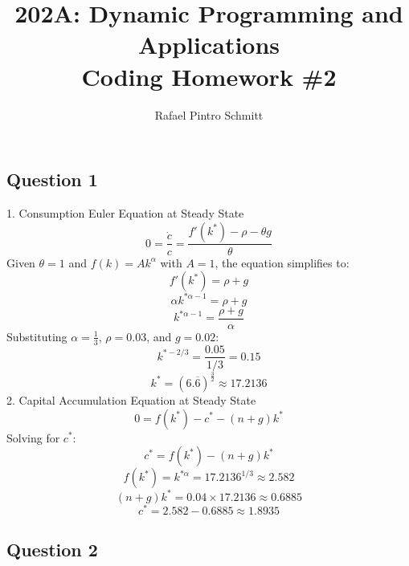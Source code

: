 \documentclass{article}
\title{202A: Dynamic Programming and Applications\\[5pt] {\Large \textbf{Coding Homework \#2}}}
\author{Rafael Pintro Schmitt}
\date{}
\begin{document}
\maketitle 

\subsection*{Question 1}

1. Consumption Euler Equation at Steady State
\[
0 = \frac{\dot{c}}{c} = \frac{f'(k^*) - \rho - \theta g}{\theta}
\]
Given $\theta = 1$ and $f(k) = Ak^\alpha$ with $A = 1$, the equation simplifies to:
\[
f'(k^*) = \rho + g
\]
\[
\alpha k^{*\alpha - 1} = \rho + g
\]
\[
k^{*\alpha - 1} = \frac{\rho + g}{\alpha}
\]
Substituting $\alpha = \frac{1}{3}$, $\rho = 0.03$, and $g = 0.02$:
\[
k^{*-2/3} = \frac{0.05}{1/3} = 0.15
\]
\[
k^* = \left(6.\overline{6}\right)^{\frac{3}{2}} \approx 17.2136
\]
2. Capital Accumulation Equation at Steady State
\[
0 = f(k^*) - c^* - (n + g)k^*
\]
Solving for $c^*$:
\[
c^* = f(k^*) - (n + g)k^*
\]
\[
f(k^*) = k^{*\alpha} = 17.2136^{1/3} \approx 2.582
\]
\[
(n + g)k^* = 0.04 \times 17.2136 \approx 0.6885
\]
\[
c^* = 2.582 - 0.6885 \approx 1.8935
\]

\subsection*{Question 2}
\end{document}

